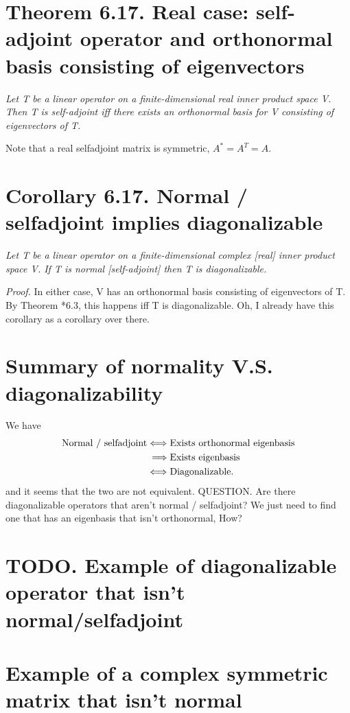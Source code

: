 \documentclass[12pt,english]{article}
\begin{document}
\section{Theorem 6.17. Real case: self-adjoint operator and orthonormal basis
consisting of eigenvectors}

\emph{Let T be a linear operator on a finite-dimensional real inner
product space V. Then T is self-adjoint iff there exists an orthonormal
basis for V consisting of eigenvectors of T.}

Note that a real selfadjoint matrix is symmetric, $A^{*}=A^{T}=A.$

\section{Corollary 6.17. Normal / selfadjoint implies diagonalizable}

\emph{Let T be a linear operator on a finite-dimensional complex {[}real{]}
inner product space V. If T is normal {[}self-adjoint{]} then T is
diagonalizable.}

\emph{Proof. }In either case, V has an orthonormal basis consisting
of eigenvectors of T. By Theorem {*}6.3, this happens iff T is diagonalizable.
Oh, I already have this corollary as a corollary over there.

\section{Summary of normality V.S. diagonalizability}

We have
\begin{align*}
\text{Normal / selfadjoint\ensuremath{\iff}} & \text{Exists orthonormal eigenbasis}\\
\implies & \text{Exists eigenbasis }\\
\iff & \text{Diagonalizable.}
\end{align*}
and it seems that the two are not equivalent. QUESTION. Are there
diagonalizable operators that aren't normal / selfadjoint? We just
need to find one that has an eigenbasis that isn't orthonormal, How?

\section{TODO. Example of diagonalizable operator that isn't normal/selfadjoint}

\section{Example of a complex symmetric matrix that isn't normal}
\end{document}
